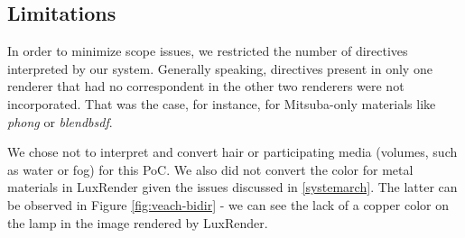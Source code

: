 %

\subsection{Limitations}
In order to minimize scope issues, we restricted the number of directives 
interpreted by our system. Generally speaking, directives present in only one 
renderer that had no correspondent in the other two renderers were not 
incorporated. That was the case, for instance, for Mitsuba-only materials like 
\textit{phong} or \textit{blendbsdf}. 

We chose not to interpret and convert hair or participating media (volumes, such 
as water or fog) for this PoC. We also did not convert the color for metal 
materials in LuxRender given the issues discussed in \ref{systemarch}. The 
latter can be observed in Figure \ref{fig:veach-bidir} - we can see the lack of a 
copper color on the lamp in the image rendered by LuxRender.




